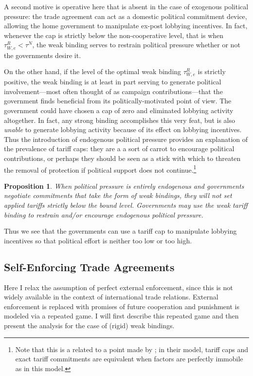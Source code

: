 \documentclass[12pt]{article}
\newtheorem{proposition}{Proposition}
\begin{document}
A second motive is operative here that is absent in the case of exogenous political pressure: the trade agreement can act as a domestic political commitment device, allowing the home government to manipulate ex-post lobbying incentives. In fact, whenever the cap is strictly below the non-cooperative level, that is when $\tau^R_{W,e} < \tau^N$, the weak binding serves to restrain political pressure whether or not the governments desire it.

On the other hand, if the level of the optimal weak binding $\tau^R_{W,e}$ is strictly positive, the weak binding is at least in part serving to generate political involvement---most often thought of as campaign contributions---that the government finds beneficial from its politically-motivated point of view. The government could have chosen a cap of zero and eliminated lobbying activity altogether. In fact, any strong binding accomplishes this very feat, but is also \textit{unable} to generate lobbying activity because of its effect on lobbying incentives. Thus the introduction of endogenous political pressure provides an explanation of the prevalence of tariff caps: they are a a sort of carrot to encourage political contributions, or perhaps they should be seen as a stick with which to threaten the removal of protection if political support does not continue.\footnote{Note that this is a related to a point made by \Textcite{mrc2007}; in their model, tariff caps and exact tariff commitments are equivalent when factors are perfectly immobile as in this model.}

\begin{proposition}
    When political pressure is entirely endogenous and governments negotiate commitments that take the form of weak bindings, they will not set applied tariffs strictly below the bound level. Governments may use the weak tariff binding to restrain and/or encourage endogenous political pressure.
		\label{res:weak}
\end{proposition}

Thus we see that the governments can use a tariff cap to manipulate lobbying incentives so that political effort is neither too low or too high.
					
	
\subsection{Self-Enforcing Trade Agreements}
\label{sec:self}
Here I relax the assumption of perfect external enforcement, since this is not widely available in the context of international trade relations. External enforcement is replaced with promises of future cooperation and punishment is modeled via a repeated game. I will first describe this repeated game and then present the analysis for the case of (rigid) weak bindings. 
\end{document}
